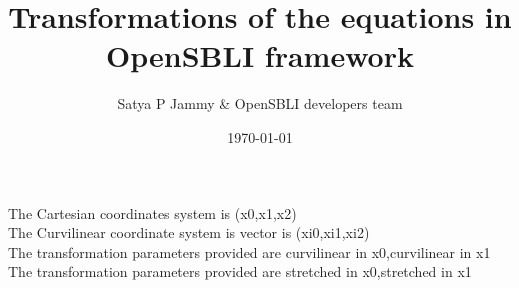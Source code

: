 \documentclass{article}
\title{Transformations of the equations in OpenSBLI framework}
\author{Satya P Jammy \& OpenSBLI developers team}
\date{\today}
\begin{document}
\maketitle
\noindent The Cartesian coordinates system is (x0,x1,x2)\\\noindent The Curvilinear coordinate system is vector is (xi0,xi1,xi2)\\\noindent The transformation parameters provided are curvilinear in x0,curvilinear in x1\\\noindent The transformation parameters provided are stretched in x0,stretched in x1\\
\end{document}
